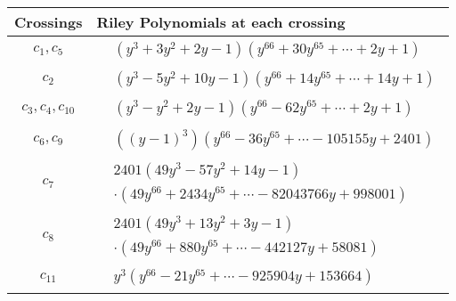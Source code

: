 \documentclass[1p]{elsarticle_modified}
\theoremstyle{definition}
\begin{document}
\begin{tabular}{m{50pt}|m{274pt}}
Crossings & \hspace{64pt}Riley Polynomials at each crossing \\
\hline $$\begin{aligned}c_{1},c_{5}\end{aligned}$$&$\begin{aligned}
&(y^3+3 y^2+2 y-1)(y^{66}+30 y^{65}+\cdots+2 y+1)
\end{aligned}$\\
\hline $$\begin{aligned}c_{2}\end{aligned}$$&$\begin{aligned}
&(y^3-5 y^2+10 y-1)(y^{66}+14 y^{65}+\cdots+14 y+1)
\end{aligned}$\\
\hline $$\begin{aligned}c_{3},c_{4},c_{10}\end{aligned}$$&$\begin{aligned}
&(y^3- y^2+2 y-1)(y^{66}-62 y^{65}+\cdots+2 y+1)
\end{aligned}$\\
\hline $$\begin{aligned}c_{6},c_{9}\end{aligned}$$&$\begin{aligned}
&((y-1)^3)(y^{66}-36 y^{65}+\cdots-105155 y+2401)
\end{aligned}$\\
\hline $$\begin{aligned}c_{7}\end{aligned}$$&$\begin{aligned}
&2401(49 y^3-57 y^2+14 y-1)\\
&\cdot(49 y^{66}+2434 y^{65}+\cdots-82043766 y+998001)
\end{aligned}$\\
\hline $$\begin{aligned}c_{8}\end{aligned}$$&$\begin{aligned}
&2401(49 y^3+13 y^2+3 y-1)\\
&\cdot(49 y^{66}+880 y^{65}+\cdots-442127 y+58081)
\end{aligned}$\\
\hline $$\begin{aligned}c_{11}\end{aligned}$$&$\begin{aligned}
&y^3(y^{66}-21 y^{65}+\cdots-925904 y+153664)
\end{aligned}$\\
\hline
\end{tabular}
\vskip 2pc
\end{document}
